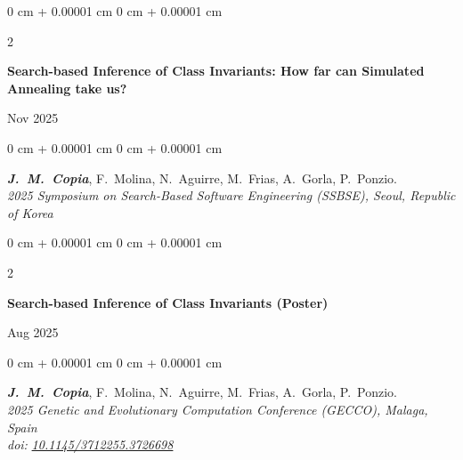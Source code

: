 \documentclass[10pt, letterpaper]{article}
\newenvironment{onecolentry}{
    \begin{adjustwidth}{
        0 cm + 0.00001 cm
    }{
        0 cm + 0.00001 cm
    }
}{
    \end{adjustwidth}
} %
\newenvironment{twocolentry}[2][]{
    \onecolentry
    \def\secondColumn{#2}
    \setcolumnwidth{\fill, 4.5 cm}
    \begin{paracol}{2}
}{
    \switchcolumn \raggedleft \secondColumn
    \end{paracol}
    \endonecolentry
} %
\begin{document}
        \begin{samepage}
            \begin{twocolentry}{
                Nov 2025
            }
                \textbf{Search-based Inference of Class Invariants: How far can Simulated Annealing take us?}
            \end{twocolentry}

            \vspace{0.1 cm}
            \begin{onecolentry}
                \mbox{\textbf{\textit{J. M. Copia}}}, \mbox{F. Molina}, \mbox{N.
                Aguirre}, \mbox{M. Frias}, \mbox{A. Gorla}, \mbox{P. Ponzio}. \\
                \textit{2025 Symposium on Search-Based Software Engineering (SSBSE), Seoul, Republic of Korea}

            \end{onecolentry}

        \end{samepage}

        \vspace{0.2 cm}

        \begin{samepage}
            \begin{twocolentry}{
                Aug 2025
            }
                \textbf{Search-based Inference of Class Invariants (Poster)}
            \end{twocolentry}

            \vspace{0.1 cm}
            \begin{onecolentry}
                \mbox{\textbf{\textit{J. M. Copia}}}, \mbox{F. Molina}, \mbox{N.
                Aguirre}, \mbox{M. Frias}, \mbox{A. Gorla}, \mbox{P. Ponzio}. \\
                \textit{2025 Genetic and Evolutionary Computation Conference (GECCO), Malaga, Spain} \\ \textit{doi:}
                \href{https://doi.org/10.1145/3712255.3726698}{\textit{10.1145/3712255.3726698}}

            \end{onecolentry}

        \end{samepage}

        \vspace{0.2 cm}
\end{document}
